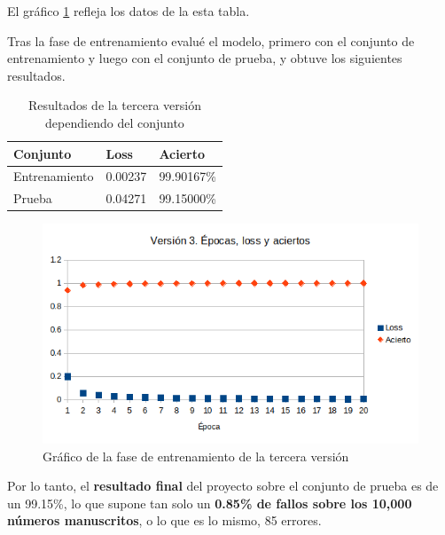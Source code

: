 \bigskip

El gráfico \ref{fig:res-v3} refleja los datos de la esta tabla.

\bigskip

Tras la fase de entrenamiento evalué el modelo, primero con el conjunto de entrenamiento y luego con el conjunto de prueba, y obtuve los siguientes resultados.

\bigskip

\begin{table}[H]
  \centering
  \begin{tabular}{|l|l|l|}
    \hline
    \textbf{Conjunto} & \textbf{Loss} & \textbf{Acierto} \\
    \hline
    Entrenamiento & 0.00237 & 99.90167\%  \\
    Prueba        & 0.04271 & 99.15000\%  \\
    \hline
  \end{tabular}
  \label{tab:results-v3}
  \caption{Resultados de la tercera versión dependiendo del conjunto}
\end{table}

\bigskip

\begin{figure}[H]
  \centering
  \includegraphics[width=1\textwidth]{../images/results-v3}
  \caption{Gráfico de la fase de entrenamiento de la tercera versión}
  \label{fig:res-v3}
\end{figure}

\bigskip

Por lo tanto, el \textbf{resultado final} del proyecto sobre el conjunto de prueba es de un 99.15\%, lo que supone tan solo un \textbf{0.85\% de fallos sobre los 10,000 números manuscritos}, o lo que es lo mismo, 85 errores.
